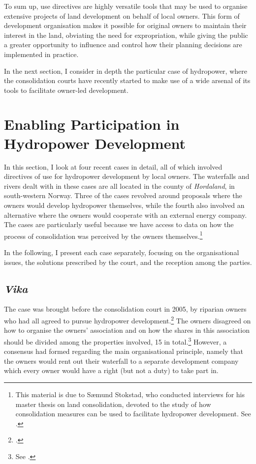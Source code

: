 To sum up, use directives are highly versatile tools that may be used to organise extensive projects of land development on behalf of local owners. This form of development organisation makes it possible for original owners to maintain their interest in the land, obviating the need for expropriation, while giving the public a greater opportunity to influence and control  how their planning decisions are implemented in practice.

In the next section, I consider in depth the particular case of hydropower, where the consolidation courts have recently started to make use of a wide arsenal of its tools to facilitate owner-led development.

\section{Enabling Participation in Hydropower Development}\label{sec:6:4}

In this section, I look at four recent cases in detail, all of which involved directives of use for hydropower development by local owners. The waterfalls and rivers dealt with in these cases are all located in the county of \emph{Hordaland}, in south-western Norway. Three of the cases revolved around proposals where the owners would develop hydropower themselves,  while the fourth also involved an alternative where the owners would cooperate with an external energy company. The cases are particularly useful because we have access to data on how the process of consolidation was perceived by the owners themselves.\footnote{This material is due to Sæmund Stokstad, who conducted interviews for his master thesis on land consolidation, devoted to the study of how consolidation measures can be used to facilitate hydropower development. See \cite{stokstad11}.}

In the following, I present each case separately, focusing on the organisational issues, the solutions prescribed by the court, and the reception among the parties.

\subsection{\emph{Vika}}\label{sec:6:4:1}

The case was brought before the consolidation court in 2005, by riparian owners who had all agreed to pursue hydropower development.\footcite{vika05} The owners disagreed on how to organise the owners' association and on how the shares in this association should be divided among the properties involved, 15 in total.\footnote{See \cite[25-28]{stokstad11}.} However, a consensus had formed regarding the main organisational principle, namely that the owners would rent out their waterfall to a separate development company which every owner would have a right (but not a duty) to take part in. 

